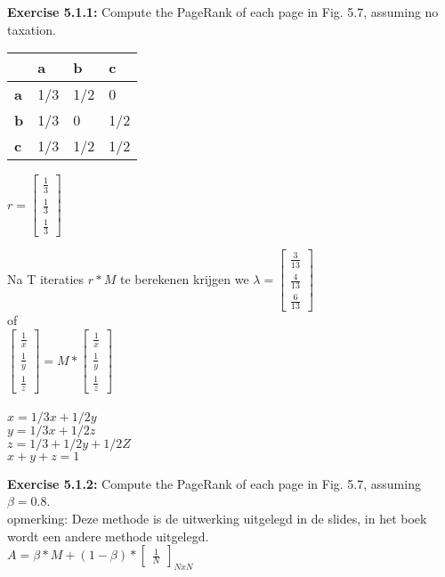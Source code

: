 \documentclass{exam}
\begin{document}
\begin{questions}
\question \textbf{Exercise 5.1.1:  }Compute the PageRank of each page in Fig. 5.7, assuming no taxation.\\


    \begin{tabular}{ | l | l | l | l |}
    \hline
    & \textbf{a} & \textbf{b} & \textbf{c} \\ \hline
    \textbf{a} & 1/3 & 1/2 & 0\\ \hline
    \textbf{b} & 1/3 & 0 & 1/2 \\ \hline
    \textbf{c} & 1/3 & 1/2 & 1/2  \\
    \hline
    \end{tabular}


$ r = \begin{bmatrix}
       \frac{1}{3} \\
       \frac{1}{3}\\
       \frac{1}{3}      
     \end{bmatrix}$

Na T iteraties $r * M$ te berekenen krijgen we $\lambda = \begin{bmatrix}
       \frac{3}{13} \\ \frac{4}{13} \\   \frac{6}{13}
     \end{bmatrix}$
 \\
 of\\
 
$ \begin{bmatrix}
       \frac{1}{x} \\
       \frac{1}{y}\\
       \frac{1}{z}      
     \end{bmatrix} = M * \begin{bmatrix}
       \frac{1}{x} \\
       \frac{1}{y}\\
       \frac{1}{z}      
     \end{bmatrix} $    \\\\
     
     $x = 1/3x + 1/2y $\\
     $y = 1/3x + 1/2z $\\
     $z = 1/3 + 1/2y + 1/2Z$\\
     $x + y + z = 1$

\question \textbf{Exercise 5.1.2:} Compute the PageRank of each page in Fig. 5.7, assuming
$\beta = 0.8$.\\
opmerking: Deze methode is de uitwerking uitgelegd in de slides, in het boek wordt een andere methode uitgelegd.\\
$A = \beta * M + (1 - \beta) * \begin{bmatrix}\frac{1}{N}\end{bmatrix}_{NxN}$


\end{questions}
\end{document}

